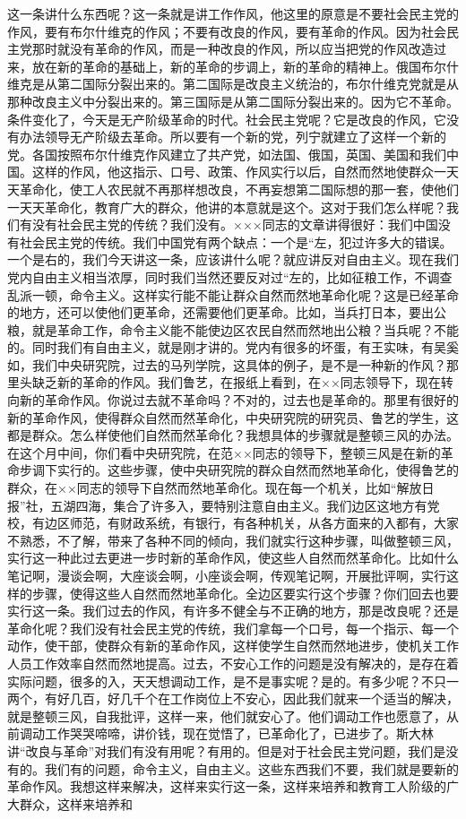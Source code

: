 这一条讲什么东西呢？这一条就是讲工作作风，他这里的原意是不要社会民主党的作风，要有布尔什维克的作风；不要有改良的作风，要有革命的作风。因为社会民主党那时就没有革命的作风，而是一种改良的作风，所以应当把党的作风改造过来，放在新的革命的基础上，新的革命的步调上，新的革命的精神上。俄国布尔什维克是从第二国际分裂出来的。第二国际是改良主义统治的，布尔什维克党就是从那种改良主义中分裂出来的。第三国际是从第二国际分裂出来的。因为它不革命。条件变化了，今天是无产阶级革命的时代。社会民主党呢？它是改良的作风，它没有办法领导无产阶级去革命。所以要有一个新的党，列宁就建立了这样一个新的党。各国按照布尔什维克作风建立了共产党，如法国、俄国，英国、美国和我们中国。这样的作风，他这指示、口号、政策、作风实行以后，自然而然地使群众一天天革命化，使工人农民就不再那样想改良，不再妄想第二国际想的那一套，使他们一天天革命化，教育广大的群众，他讲的本意就是这个。这对于我们怎么样呢？我们有没有社会民主党的传统？我们没有。×××同志的文章讲得很好：我们中国没有社会民主党的传统。我们中国党有两个缺点：一个是“左，犯过许多大的错误。一个是右的，我们今天讲这一条，应该讲什么呢？就应讲反对自由主义。现在我们党内自由主义相当浓厚，同时我们当然还要反对过“左的，比如征粮工作，不调查乱派一顿，命令主义。这样实行能不能让群众自然而然地革命化呢？这是已经革命的地方，还可以使他们更革命，还需要他们更革命。比如，当兵打日本，要出公粮，就是革命工作，命令主义能不能使边区农民自然而然地出公粮？当兵呢？不能的。同时我们有自由主义，就是刚才讲的。党内有很多的坏蛋，有王实味，有吴奚如，我们中央研究院，过去的马列学院，这具体的例子，是不是一种新的作风？那里头缺乏新的革命的作风。我们鲁艺，在报纸上看到，在××同志领导下，现在转向新的革命作风。你说过去就不革命吗？不对的，过去也是革命的。那里有很好的新的革命作风，使得群众自然而然革命化，中央研究院的研究员、鲁艺的学生，这都是群众。怎么样使他们自然而然革命化？我想具体的步骤就是整顿三风的办法。在这个月中间，你们看中央研究院，在范××同志的领导下，整顿三风是在新的革命步调下实行的。这些步骤，使中央研究院的群众自然而然地革命化，使得鲁艺的群众，在××同志的领导下自然而然地革命化。现在每一个机关，比如“解放日报”社，五湖四海，集合了许多入，要特别注意自由主义。我们边区这地方有党校，有边区师范，有财政系统，有银行，有各种机关，从各方面来的入都有，大家不熟悉，不了解，带来了各种不同的倾向，我们就实行这种步骤，叫做整顿三风，实行这一种此过去更进一步时新的革命作风，使这些人自然而然革命化。比如什么笔记啊，漫谈会啊，大座谈会啊，小座谈会啊，传观笔记啊，开展批评啊，实行这样的步骤，使得这些人自然而然地革命化。全边区要实行这个步骤？你们回去也要实行这一条。我们过去的作风，有许多不健全与不正确的地方，那是改良呢？还是革命化呢？我们没有社会民主党的传统，我们拿每一个口号，每一个指示、每一个动作，使干部，使群众有新的革命作风，这样使学生自然而然地进步，使机关工作人员工作效率自然而然地提高。过去，不安心工作的问题是没有解决的，是存在着实际问题，很多的入，天天想调动工作，是不是事实呢？是的。有多少呢？不只一两个，有好几百，好几千个在工作岗位上不安心，因此我们就来一个适当的解决，就是整顿三风，自我批评，这样一来，他们就安心了。他们调动工作也愿意了，从前调动工作哭哭啼啼，讲价钱，现在觉悟了，已革命化了，已进步了。斯大林讲“改良与革命”对我们有没有用呢？有用的。但是对于社会民主党问题，我们是没有的。我们有的问题，命令主义，自由主义。这些东西我们不要，我们就是要新的革命作风。我想这样来解决，这样来实行这一条，这样来培养和教育工人阶级的广大群众，这样来培养和